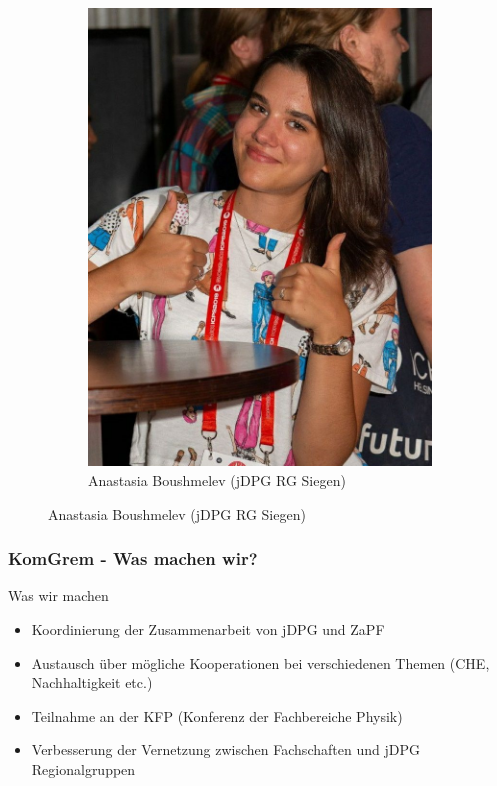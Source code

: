\documentclass[compress, aspectratio=169]{beamer}
\begin{document}
\begin{frame}
\begin{figure}
\begin{subfigure}[t]{0.24\textwidth}
				\includegraphics[width = \textwidth]{boushmelev.jpg}
				\caption*{Anastasia Boushmelev (jDPG RG Siegen)}
		\end{subfigure}
 \end{figure}
\end{frame}

\begin{frame}\frametitle{KomGrem - Was machen wir?}
	\begin{block}{Was wir machen}
		\begin{itemize}
			\item Koordinierung der Zusammenarbeit von jDPG und ZaPF
			\item Austausch über mögliche Kooperationen bei verschiedenen Themen (CHE, Nachhaltigkeit etc.)
			\item Teilnahme an der KFP (Konferenz der Fachbereiche Physik)
			\item Verbesserung der Vernetzung zwischen Fachschaften und jDPG Regionalgruppen
		\end{itemize}
	\end{block}
\end{frame}
\end{document}
